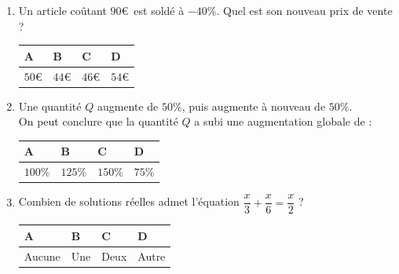 \documentclass[oneside,12pt]{exam}          %
\begin{document}
\begin{enumerate}[resume*]

		

	\item Un article coûtant $90$\euro\, est soldé à $-40\%$. Quel est son nouveau prix de vente ?
	
		\hspace{\linewidth-\textwidth}
		\renewcommand{\arraystretch}{1.5}
		\begin{tabular}{| P{0.22\textwidth} | P{0.22\textwidth} | P{0.22\textwidth} | P{0.22\textwidth} |} \hline
			A & B & C & D \\ \hline
			$50$\euro & $44$\euro & $46$\euro & $54$\euro \\ \hline
		\end{tabular}
		
		

	\item Une quantité $Q$ augmente de $50\%$, puis augmente à nouveau de $50\%$. \\
	On peut conclure que la quantité $Q$ a subi une augmentation globale de :
	
		\hspace{\linewidth-\textwidth}
		\renewcommand{\arraystretch}{1.5}
		\begin{tabular}{| P{0.22\textwidth} | P{0.22\textwidth} | P{0.22\textwidth} | P{0.22\textwidth} |} \hline
			A & B & C & D \\ \hline
			$100\%$ & $125\%$ & $150\%$ & $75\%$ \\ \hline
		\end{tabular}	



	\item Combien de solutions réelles admet l'équation $\dfrac{x}{3} + \dfrac{x}{6} = \dfrac{x}{2}$ ?
	
		\hspace{\linewidth-\textwidth}
		\renewcommand{\arraystretch}{1.5}
		\begin{tabular}{| P{0.22\textwidth} | P{0.22\textwidth} | P{0.22\textwidth} | P{0.22\textwidth} |} \hline
			A & B & C & D \\ \hline
			Aucune & Une & Deux & Autre \\ \hline
		\end{tabular}	

		
\end{enumerate}
\end{document}
